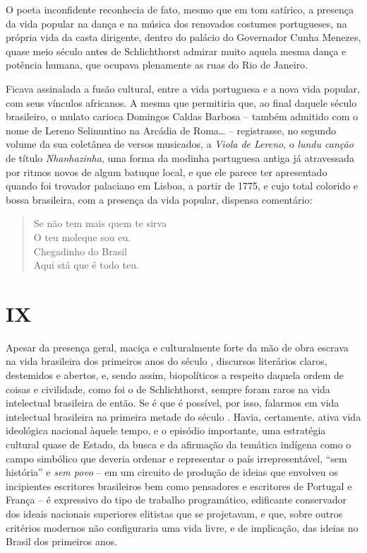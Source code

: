 O poeta inconfidente reconhecia de fato, mesmo que em tom satírico, a
presença da vida popular na dança e na música dos renovados costumes
portugueses, na própria vida da casta dirigente, dentro do palácio do
Governador Cunha Menezes, quase meio século antes de Schlichthorst
admirar muito aquela mesma dança e potência humana, que ocupava
plenamente as ruas do Rio de Janeiro.

Ficava assinalada a fusão cultural, entre a vida portuguesa e a nova
vida popular, com seus vínculos africanos. A mesma que permitiria que,
ao final daquele século  brasileiro, o mulato carioca Domingos
Caldas Barbosa -- também admitido com o nome de Lereno Selinuntino na
Arcádia de Roma\ldots{} -- registrasse, no segundo volume da sua coletânea de
versos musicados, a \emph{Viola de Lereno}, o \emph{lundu canção} de
título \emph{Nhanhazinha}, uma forma da modinha portuguesa antiga já
atravessada por ritmos novos de algum batuque local, e que ele parece
ter apresentado quando foi trovador palaciano em Lisboa, a partir de
1775, e cujo total colorido e bossa brasileira, com a presença da vida
popular, dispensa comentário:

\begin{verse}
Se não tem mais quem te sirva\\
O teu moleque sou eu.\\
Chegadinho do Brasil\\
Aqui stá que é todo teu.
\end{verse}

\section{IX}

Apesar da presença geral, maciça e culturalmente forte da mão de obra
escrava na vida brasileira dos primeiros anos do século , discursos
literários claros, destemidos e abertos, e, sendo assim, biopolíticos a
respeito daquela ordem de coisas e civilidade, como foi o de
Schlichthorst, sempre foram raros na vida intelectual brasileira de
então. Se é que é possível, por isso, falarmos em vida intelectual
brasileira na primeira metade do século . Havia, certamente, ativa
vida ideológica nacional àquele tempo, e o episódio importante, uma
estratégia cultural quase de Estado, da busca e da afirmação da temática
indígena como o campo simbólico que deveria ordenar e representar o país
irrepresentável, ``sem história'' e \emph{sem povo} -- em um circuito de
produção de ideias que envolveu os incipientes escritores brasileiros
bem como pensadores e escritores de Portugal e França -- é expressivo do
tipo de trabalho programático, edificante conservador dos ideais
nacionais superiores elitistas que se projetavam, e que, sobre outros
critérios modernos não configuraria uma vida livre, e de implicação, das
ideias no Brasil dos primeiros anos.

